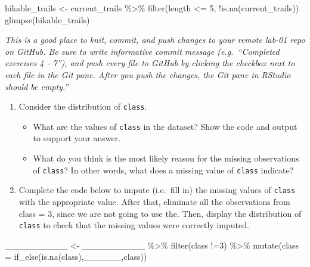 \documentclass[
]{article}
\newenvironment{Shaded}{\begin{snugshade}}{\end{snugshade}}
\newcommand{\AttributeTok}[1]{\textcolor[rgb]{0.77,0.63,0.00}{#1}}
\newcommand{\DecValTok}[1]{\textcolor[rgb]{0.00,0.00,0.81}{#1}}
\newcommand{\FunctionTok}[1]{\textcolor[rgb]{0.00,0.00,0.00}{#1}}
\newcommand{\NormalTok}[1]{#1}
\newcommand{\OtherTok}[1]{\textcolor[rgb]{0.56,0.35,0.01}{#1}}
\newcommand{\SpecialCharTok}[1]{\textcolor[rgb]{0.00,0.00,0.00}{#1}}
\providecommand{\tightlist}{%
  \setlength{\itemsep}{0pt}\setlength{\parskip}{0pt}}
\begin{document}
\begin{Shaded}
\begin{Highlighting}[]
\NormalTok{hikable\_trails }\OtherTok{\textless{}{-}}\NormalTok{ current\_trails }\SpecialCharTok{\%\textgreater{}\%}
  \FunctionTok{filter}\NormalTok{(length }\SpecialCharTok{\textless{}=} \DecValTok{5}\NormalTok{, }\SpecialCharTok{!}\FunctionTok{is.na}\NormalTok{(current\_trails))}
\FunctionTok{glimpse}\NormalTok{(hikable\_trails)}
\end{Highlighting}
\end{Shaded}

\emph{This is a good place to knit, commit, and push changes to your
remote lab-01 repo on GitHub. Be sure to write informative commit
message (e.g.~``Completed exercises 4 - 7''), and push every file to
GitHub by clicking the checkbox next to each file in the Git pane. After
you push the changes, the Git pane in RStudio should be empty.''}

\begin{enumerate}
\def\labelenumi{\arabic{enumi}.}
\setcounter{enumi}{7}
\tightlist
\item
  Consider the distribution of \texttt{class}.

  \begin{itemize}
  \tightlist
  \item
    What are the values of \texttt{class} in the dataset? Show the code
    and output to support your answer.
  \item
    What do you think is the most likely reason for the missing
    observations of \texttt{class}? In other words, what does a missing
    value of \texttt{class} indicate?
  \end{itemize}
\item
  Complete the code below to impute (i.e.~fill in) the missing values of
  \texttt{class} with the appropriate value. After that, eliminate all
  the observations from class = 3, since we are not going to use the.
  Then, display the distribution of \texttt{class} to check that the
  missing values were correctly imputed.
\end{enumerate}

\begin{Shaded}
\begin{Highlighting}[]
\NormalTok{\_\_\_\_\_\_\_\_\_\_ }\OtherTok{\textless{}{-}}\NormalTok{ \_\_\_\_\_\_\_\_\_\_ }\SpecialCharTok{\%\textgreater{}\%} \FunctionTok{filter}\NormalTok{(class }\SpecialCharTok{!=}\DecValTok{3}\NormalTok{) }\SpecialCharTok{\%\textgreater{}\%} 
  \FunctionTok{mutate}\NormalTok{(}\AttributeTok{class =} \FunctionTok{if\_else}\NormalTok{(}\FunctionTok{is.na}\NormalTok{(class),\_\_\_\_\_\_,class)) }
\end{Highlighting}
\end{Shaded}
\end{document}
